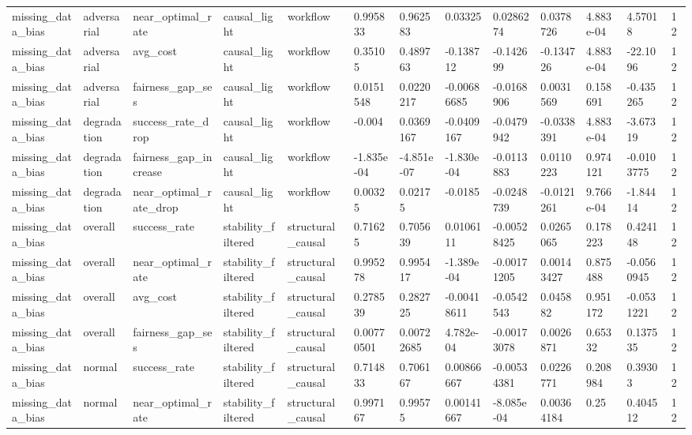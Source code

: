 \begin{tabular}{lllllllllllll}
missing\_data\_bias & adversarial & near\_optimal\_rate & causal\_light & workflow & 0.995833 & 0.962583 & 0.03325 & 0.0286274 & 0.0378726 & 4.883e-04 & 4.57018 & 12 \\
missing\_data\_bias & adversarial & avg\_cost & causal\_light & workflow & 0.35105 & 0.489763 & -0.138712 & -0.142699 & -0.134726 & 4.883e-04 & -22.1096 & 12 \\
missing\_data\_bias & adversarial & fairness\_gap\_ses & causal\_light & workflow & 0.0151548 & 0.0220217 & -0.00686685 & -0.0168906 & 0.0031569 & 0.158691 & -0.435265 & 12 \\
missing\_data\_bias & degradation & success\_rate\_drop & causal\_light & workflow & -0.004 & 0.0369167 & -0.0409167 & -0.0479942 & -0.0338391 & 4.883e-04 & -3.67319 & 12 \\
missing\_data\_bias & degradation & fairness\_gap\_increase & causal\_light & workflow & -1.835e-04 & -4.851e-07 & -1.830e-04 & -0.0113883 & 0.0110223 & 0.974121 & -0.0103775 & 12 \\
missing\_data\_bias & degradation & near\_optimal\_rate\_drop & causal\_light & workflow & 0.00325 & 0.02175 & -0.0185 & -0.0248739 & -0.0121261 & 9.766e-04 & -1.84414 & 12 \\
missing\_data\_bias & overall & success\_rate & stability\_filtered & structural\_causal & 0.71625 & 0.705639 & 0.0106111 & -0.00528425 & 0.0265065 & 0.178223 & 0.424148 & 12 \\
missing\_data\_bias & overall & near\_optimal\_rate & stability\_filtered & structural\_causal & 0.995278 & 0.995417 & -1.389e-04 & -0.00171205 & 0.00143427 & 0.875488 & -0.0560945 & 12 \\
missing\_data\_bias & overall & avg\_cost & stability\_filtered & structural\_causal & 0.278539 & 0.282725 & -0.00418611 & -0.0542543 & 0.045882 & 0.951172 & -0.0531221 & 12 \\
missing\_data\_bias & overall & fairness\_gap\_ses & stability\_filtered & structural\_causal & 0.00770501 & 0.00722685 & 4.782e-04 & -0.00173078 & 0.0026871 & 0.65332 & 0.137535 & 12 \\
missing\_data\_bias & normal & success\_rate & stability\_filtered & structural\_causal & 0.714833 & 0.706167 & 0.00866667 & -0.00534381 & 0.0226771 & 0.208984 & 0.39303 & 12 \\
missing\_data\_bias & normal & near\_optimal\_rate & stability\_filtered & structural\_causal & 0.997167 & 0.99575 & 0.00141667 & -8.085e-04 & 0.00364184 & 0.25 & 0.404512 & 12 \\

\end{tabular}
